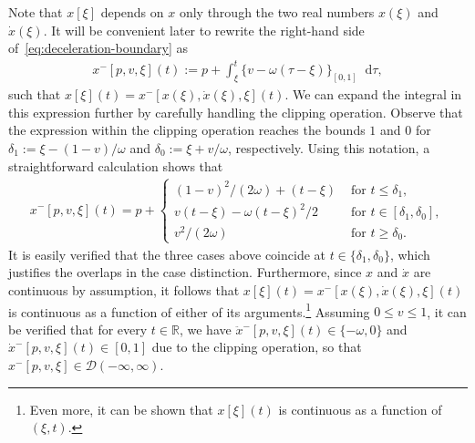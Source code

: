 \documentclass[a4paper]{report}
\theoremstyle{definition}
\theoremstyle{plain}
\newcommand*\diff{\mathop{}\!\mathrm{d}}
\begin{document}
Note that $x[\xi]$ depends on $x$ only through the two real numbers $x(\xi)$ and
$\dot{x}(\xi)$. It will be convenient later to rewrite the right-hand side
of~\eqref{eq:deceleration-boundary} as
\begin{align}\label{eq:def-x-}
  x^{-}[p, v, \xi](t) := p + \int_{\xi}^{t} \{ v - \omega(\tau - \xi) \}_{[0,1]} \diff \tau ,
\end{align}
such that $x[\xi](t) = x^{-}[x(\xi), \dot{x}(\xi), \xi](t)$.
%
We can expand the integral in this expression further by carefully handling the
clipping operation. Observe that the expression within the clipping operation
reaches the bounds $1$ and $0$ for $\delta_{1} := \xi - (1-v)/\omega$ and
$\delta_{0} := \xi + v/\omega$, respectively. Using this notation, a straightforward
calculation shows that
\begin{align}\label{eq:x-}
  x^{-}[p,v,\xi](t) = p +
  \begin{cases}
    {(1 - v)}^{2} / (2\omega) + (t - \xi) & \text{ for } t \leq \delta_{1} , \\
    v(t - \xi) - \omega{(t-\xi)}^{2} /2 & \text{ for } t \in [\delta_{1} , \delta_{0}] , \\
    v^{2}/(2\omega) & \text{ for } t \geq \delta_{0} .
  \end{cases}
\end{align}
%
It is easily verified that the three cases above coincide at
$t \in \{\delta_{1}, \delta_{0}\}$, which justifies the overlaps in the case distinction.
Furthermore, since $x$ and $\dot{x}$ are continuous by assumption, it follows
that $x[\xi](t) = x^{-}[x(\xi), \dot{x}(\xi), \xi](t)$ is continuous as a function of
either of its arguments.\footnote{Even more, it can be shown that $x[\xi](t)$ is continuous as a function of $(\xi, t)$.}
%
Assuming $0 \leq v \leq 1$, it can be verified that for every $t \in \mathbb{R}$, we
have $\ddot{x}^{-}[p,v,\xi](t) \in \{-\omega, 0\}$ and
$\dot{x}^{-}[p,v,\xi](t) \in [0,1]$ due to the clipping operation, so that
$x^{-}[p,v,\xi] \in \mathcal{D}(-\infty,\infty)$.
\end{document}
